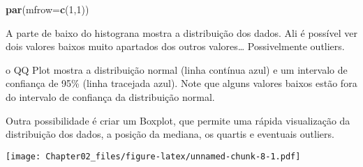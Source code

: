 \documentclass[
]{article}
\newenvironment{Shaded}{\begin{snugshade}}{\end{snugshade}}
\newcommand{\CommentTok}[1]{\textcolor[rgb]{0.56,0.35,0.01}{\textit{#1}}}
\newcommand{\DataTypeTok}[1]{\textcolor[rgb]{0.13,0.29,0.53}{#1}}
\newcommand{\DecValTok}[1]{\textcolor[rgb]{0.00,0.00,0.81}{#1}}
\newcommand{\KeywordTok}[1]{\textcolor[rgb]{0.13,0.29,0.53}{\textbf{#1}}}
\newcommand{\NormalTok}[1]{#1}
\newcommand{\OperatorTok}[1]{\textcolor[rgb]{0.81,0.36,0.00}{\textbf{#1}}}
\newcommand{\StringTok}[1]{\textcolor[rgb]{0.31,0.60,0.02}{#1}}
\begin{document}
\begin{Shaded}
\begin{Highlighting}[]
\KeywordTok{par}\NormalTok{(}\DataTypeTok{mfrow=}\KeywordTok{c}\NormalTok{(}\DecValTok{1}\NormalTok{,}\DecValTok{1}\NormalTok{))}
\end{Highlighting}
\end{Shaded}

A parte de baixo do histograna mostra a distribuição dos dados. Ali é
possível ver dois valores baixos muito apartados dos outros
valores\ldots{} Possivelmente outliers.

o QQ Plot mostra a distribuição normal (linha contínua azul) e um
intervalo de confiança de 95\% (linha tracejada azul). Note que alguns
valores baixos estão fora do intervalo de confiança da distribuição
normal.

Outra possibilidade é criar um Boxplot, que permite uma rápida
visualização da distribuição dos dados, a posição da mediana, os quartis
e eventuais outliers.

\begin{Shaded}
\end{Shaded}

\texttt{[image: Chapter02\_files/figure-latex/unnamed-chunk-8-1.pdf]}
\end{document}
